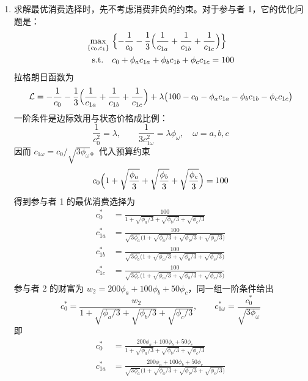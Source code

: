 \begin{solution}
\begin{enumerate}[label=(\alph*)]
    \item 求解最优消费选择时，先不考虑消费非负的约束。对于参与者 1，它的优化问题是：
    \[
        \begin{aligned}
            \max_{\{c_{0},c_{1}\}}\ &\Bigl\{-\frac{1}{c_{0}}-\frac13\Bigl(\frac{1}{c_{1a}}+\frac{1}{c_{1b}}+\frac{1}{c_{1c}}\Bigr)\Bigr\}\\
            \mathrm{s.t.}\quad &c_{0}+\phi_{a}c_{1a}+\phi_{b}c_{1b}+\phi_{c}c_{1c}=100
        \end{aligned}
    \]
    拉格朗日函数为
    \[
        \mathcal{L}=-\frac{1}{c_{0}}-\frac13\Bigl(\frac{1}{c_{1a}}+\frac{1}{c_{1b}}+\frac{1}{c_{1c}}\Bigr)+\lambda\bigl(100-c_{0}-\phi_{a}c_{1a}-\phi_{b}c_{1b}-\phi_{c}c_{1c}\bigr)
    \]
    一阶条件是边际效用与状态价格成比例：
    \[
        \frac{1}{c_{0}^{2}}=\lambda,\qquad
        \frac{1}{3c_{1\omega}^{2}}=\lambda\phi_{\omega},\quad\omega=a,b,c
    \]
    因而 $c_{1\omega}=c_{0}/\sqrt{3\phi_{\omega}}$。代入预算约束
    \[
        c_{0}\Bigl(1+\sqrt{\frac{\phi_{a}}{3}}+\sqrt{\frac{\phi_{b}}{3}}+\sqrt{\frac{\phi_{c}}{3}}\Bigr)=100
    \]
    得到参与者 1 的最优消费选择为
    \[
        \begin{aligned}
            c_{0}^{*}&=\frac{100}{1+\sqrt{\phi_{a}/3}+\sqrt{\phi_{b}/3}+\sqrt{\phi_{c}/3}}\\
            c_{1a}^{*}&=\frac{100}{\sqrt{3\phi_{a}}\bigl(1+\sqrt{\phi_{a}/3}+\sqrt{\phi_{b}/3}+\sqrt{\phi_{c}/3}\bigr)}\\
            c_{1b}^{*}&=\frac{100}{\sqrt{3\phi_{b}}\bigl(1+\sqrt{\phi_{a}/3}+\sqrt{\phi_{b}/3}+\sqrt{\phi_{c}/3}\bigr)}\\
            c_{1c}^{*}&=\frac{100}{\sqrt{3\phi_{c}}\bigl(1+\sqrt{\phi_{a}/3}+\sqrt{\phi_{b}/3}+\sqrt{\phi_{c}/3}\bigr)}
        \end{aligned}
    \]
    参与者 2 的财富为 $w_{2}=200\phi_{a}+100\phi_{b}+50\phi_{c}$，同一组一阶条件给出
    \[
        c_{0}^{*}=\frac{w_{2}}{1+\sqrt{\phi_{a}/3}+\sqrt{\phi_{b}/3}+\sqrt{\phi_{c}/3}},\qquad
        c_{1\omega}^{*}=\frac{c_{0}^{*}}{\sqrt{3\phi_{\omega}}}
    \]
    即
    \[
        \begin{aligned}
            c_{0}^{*}&=\frac{200\phi_{a}+100\phi_{b}+50\phi_{c}}{1+\sqrt{\phi_{a}/3}+\sqrt{\phi_{b}/3}+\sqrt{\phi_{c}/3}}\\
            c_{1a}^{*}&=\frac{200\phi_{a}+100\phi_{b}+50\phi_{c}}{\sqrt{3\phi_{a}}\bigl(1+\sqrt{\phi_{a}/3}+\sqrt{\phi_{b}/3}+\sqrt{\phi_{c}/3}\bigr)}\\

\end{aligned}\]
\end{enumerate}
\end{solution}
